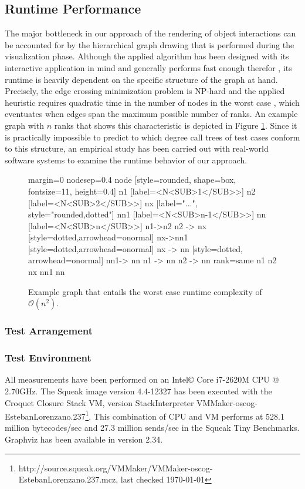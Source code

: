 \subsection{Runtime Performance}
\label{ss:DiscussionPerformance}
The major bottleneck in our approach of the rendering of object interactions can be accounted for by the hierarchical graph drawing that is performed during the visualization phase.
Although the applied algorithm has been designed with its interactive application in mind and generally performs fast enough therefor \cite{gansner_technique_1993}, its runtime is heavily dependent on the specific structure of the graph at hand.
Precisely, the edge crossing minimization problem is NP-hard and the applied heuristic requires quadratic time in the number of nodes in the worst case \cite{tamassia_handbook_2013}, which eventuates when edges span the maximum possible number of ranks.
An example graph with $n$ ranks that shows this characteristic is depicted in Figure \ref{fig:graph-worst-case}.
Since it is practically impossible to predict to which degree call trees of test cases conform to this structure, an empirical study has been carried out with real-world software systems to examine the runtime behavior of our approach.

\begin{figure}[b]
	\centering	
	{
		margin=0
		nodesep=0.4
		node [style=rounded, shape=box, fontsize=11, height=0.4]
		n1 [label=<N<SUB>1</SUB>>]
		n2 [label=<N<SUB>2</SUB>>]
		nx [label="...", style="rounded,dotted"]
		nn1 [label=<N<SUB>n-1</SUB>>]
		nn [label=<N<SUB>n</SUB>>]
		n1->n2
		n2 -> nx [style=dotted,arrowhead=onormal]
		nx->nn1 [style=dotted,arrowhead=onormal]
		nx -> nn [style=dotted, arrowhead=onormal]
		nn1-> nn
		n1 -> nn
		n2 -> nn
		{rank=same n1 n2 nx nn1 nn}
	}
	\caption[Example Graph that Entails Worst Case Runtime Complexity]{Example graph that entails the worst case runtime complexity of $\mathcal O(n^2)$.}
	\label{fig:graph-worst-case}
\end{figure}

\subsubsection{Test Arrangement}

\subsubsection{Test Environment}
All measurements have been performed on an Intel\copyright{} Core\texttrademark{}  i7-2620M CPU @ 2.70GHz.
The Squeak image version 4.4-12327 has been executed with the Croquet Closure Stack VM, version StackInterpreter VMMaker-oscog-EstebanLorenzano.237\footnote{http://source.squeak.org/VMMaker/VMMaker-oscog-EstebanLorenzano.237.mcz, last checked \today}. 
This combination of CPU and VM performs at 528.1 million bytecodes/sec and 27.3 million sends/sec in the Squeak Tiny Benchmarks. Graphviz has been available in version 2.34.

